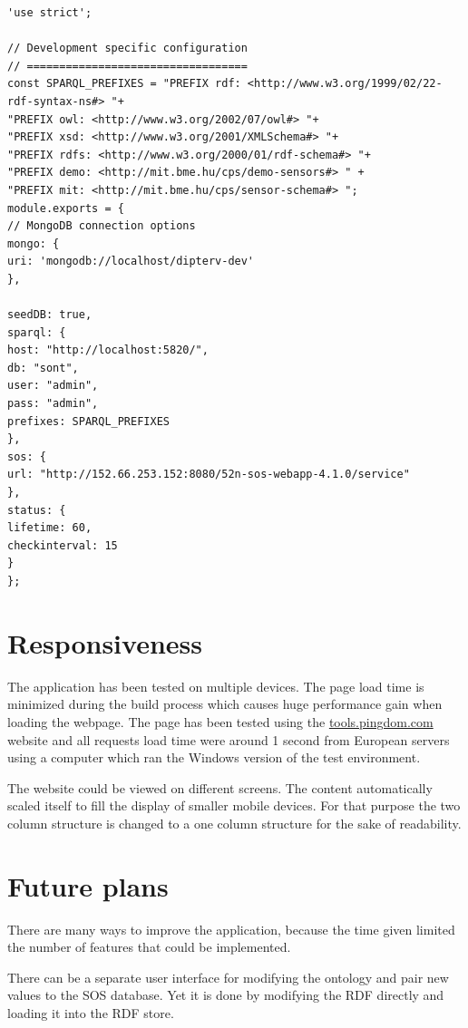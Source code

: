 \begin{lstlisting}[caption={Sample configuration for development environment\label{lst:devconf}}]
'use strict';

// Development specific configuration
// ==================================
const SPARQL_PREFIXES = "PREFIX rdf: <http://www.w3.org/1999/02/22-rdf-syntax-ns#> "+
"PREFIX owl: <http://www.w3.org/2002/07/owl#> "+
"PREFIX xsd: <http://www.w3.org/2001/XMLSchema#> "+
"PREFIX rdfs: <http://www.w3.org/2000/01/rdf-schema#> "+
"PREFIX demo: <http://mit.bme.hu/cps/demo-sensors#> " +
"PREFIX mit: <http://mit.bme.hu/cps/sensor-schema#> ";
module.exports = {
// MongoDB connection options
mongo: {
uri: 'mongodb://localhost/dipterv-dev'
},

seedDB: true,
sparql: {
host: "http://localhost:5820/",
db: "sont",
user: "admin",
pass: "admin",
prefixes: SPARQL_PREFIXES
},
sos: {
url: "http://152.66.253.152:8080/52n-sos-webapp-4.1.0/service"
},
status: {
lifetime: 60,
checkinterval: 15
}
};
\end{lstlisting}

\section{Responsiveness}

The application has been tested on multiple devices. The page load time is minimized during the build process which causes huge performance gain when loading the webpage. The page has been tested using the \url{tools.pingdom.com} website and all requests load time were around 1 second from European servers using a computer which ran the Windows version of the test environment. 

The website could be viewed on different screens. The content automatically scaled itself to fill the display of smaller mobile devices. For that purpose the two column structure is changed to a one column structure for the sake of readability.

\section{Future plans}

There are many ways to improve the application, because the time given limited the number of features that could be implemented. 

There can be a separate user interface for modifying the ontology and pair new values to the SOS database. Yet it is done by modifying the RDF directly and loading it into the RDF store. 

